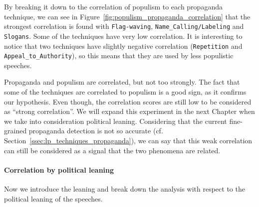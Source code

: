 By breaking it down to the correlation of populism to each propaganda technique, we can see in Figure~\ref{fig:populism_propaganda_correlation} that the strongest correlation is found with \texttt{Flag-waving}, \texttt{Name\_Calling/Labeling} and \texttt{Slogans}. Some of the techniques have very low correlation. It is interesting to notice that two techniques have slightly negative correlation (\texttt{Repetition} and \texttt{Appeal\_to\_Authority}), so this means that they are used by less populistic speeches.



Propaganda and populism are correlated, but not too strongly.
The fact that some of the techniques are correlated to populism is a good sign, as it confirms our hypothesis. Even though, the correlation scores are still low to be considered as ``strong correlation''. We will expand this experiment in the next Chapter when we take into consideration political leaning.
Considering that the current fine-grained propaganda detection is not so accurate (cf. Section~\ref{ssec:lp_techniques_propaganda}), we can say that this weak correlation can still be considered as a signal that the two phenomena are related.


\paragraph{Correlation by political leaning}
Now we introduce the leaning and %
break down the analysis with respect to the political leaning of the speeches.

